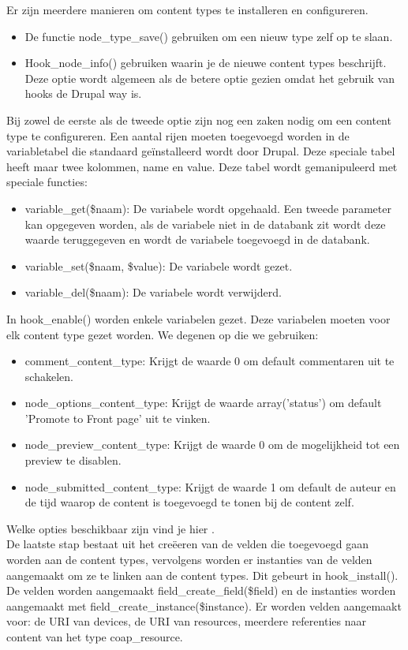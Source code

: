 Er zijn meerdere manieren om content types te installeren en configureren.
\begin{itemize}
\item De functie node\_type\_save() gebruiken om een nieuw type zelf op te slaan.
\item Hook\_node\_info() gebruiken waarin je de nieuwe content types beschrijft. Deze optie wordt algemeen als de betere optie gezien omdat het gebruik van hooks de Drupal way is.
\end{itemize}
Bij zowel de eerste als de tweede optie zijn nog een zaken nodig om een content type te configureren. Een aantal rijen moeten toegevoegd worden in de variabletabel die standaard ge\"{i}nstalleerd wordt door Drupal. Deze speciale tabel heeft maar twee kolommen, name en value. Deze tabel wordt gemanipuleerd met speciale functies:
\begin{itemize}
\item variable\_get(\$naam): De variabele wordt opgehaald. Een tweede parameter kan opgegeven worden, als de variabele niet in de databank zit wordt deze waarde teruggegeven en wordt de variabele toegevoegd in de databank.
\item variable\_set(\$naam, \$value): De variabele wordt gezet.
\item variable\_del(\$naam): De variabele wordt verwijderd.
\end{itemize}

\noindent
In hook\_enable() worden enkele variabelen gezet. Deze variabelen moeten voor elk content type gezet worden. We degenen op die we gebruiken:
\begin{itemize}
\item comment\_content\_type: Krijgt de waarde 0 om default commentaren uit te schakelen.
\item node\_options\_content\_type: Krijgt de waarde array('status') om default 'Promote to Front page' uit te vinken.
\item node\_preview\_content\_type: Krijgt de waarde 0 om de mogelijkheid tot een preview te disablen.
\item node\_submitted\_content\_type: Krijgt de waarde 1 om default de auteur en de tijd waarop de content is toegevoegd te tonen bij de content zelf.
\end{itemize}
Welke opties beschikbaar zijn vind je hier \cite{contentTypeVariables}.\\

\noindent
De laatste stap bestaat uit het cre\"{e}eren van de velden die toegevoegd gaan worden aan de content types, vervolgens worden er instanties van de velden aangemaakt om ze te linken aan de content types. Dit gebeurt in hook\_install(). De velden worden aangemaakt field\_create\_field(\$field) en de instanties worden aangemaakt met field\_create\_instance(\$instance). Er worden velden aangemaakt voor: de URI van devices, de URI van resources, meerdere referenties naar content van het type coap\_resource.

